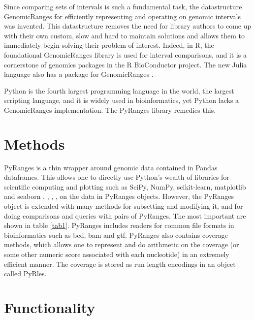 \documentclass[10pt,letterpaper]{article}
\begin{document}
Since comparing sets of intervals is such a fundamental task, the datastructure
GenomicRanges for efficiently representing and operating on genomic intervals
was invented. This datastructure removes the need for library authors to come up
with their own custom, slow and hard to maintain solutions and allows them to
immediately begin solving their problem of interest. Indeed, in R, the
foundational GenomicRanges library \cite{10.1371/journal.pcbi.1003118} is used
for interval comparisons, and it is a cornerstone of genomics packages in the R
BioConductor \cite{Gentleman2004} project. The new Julia language
\cite{doi:10.1137/141000671} also has a package for GenomicRanges
\cite{Haverty2017}.

Python is the fourth largest programming language in the world, the largest
scripting language, and it is widely used in bioinformatics, yet Python lacks a
GenomicRanges implementation. The PyRanges library remedies this.

\section*{Methods}

PyRanges is a thin wrapper around genomic data contained in Pandas
\cite{mckinney-proc-scipy-2010} dataframes. This allows one to directly use
Python's wealth of libraries for scientific computing and plotting such as
SciPy, NumPy, scikit-learn, matplotlib and seaborn \cite{scipy},
\cite{oliphant-2006-guide}, \cite{scikit-learn}, \cite{Hunter:2007},
\cite{michael_waskom_2017_883859} on the data in PyRanges objects. However, the
PyRanges object is extended with many methods for subsetting and modifying it,
and for doing comparisons and queries with pairs of PyRanges. The most important
are shown in table \ref{tab1}. PyRanges includes readers for common file formats
in bioinformatics such as bed, bam and gtf. PyRanges also contains coverage
methods, which allows one to represent and do arithmetic on the coverage (or
some other numeric score associated with each nucleotide) in an extremely
efficient manner. The coverage is stored as run length encodings in an object
called PyRles.

\section*{Functionality}

\end{document}
